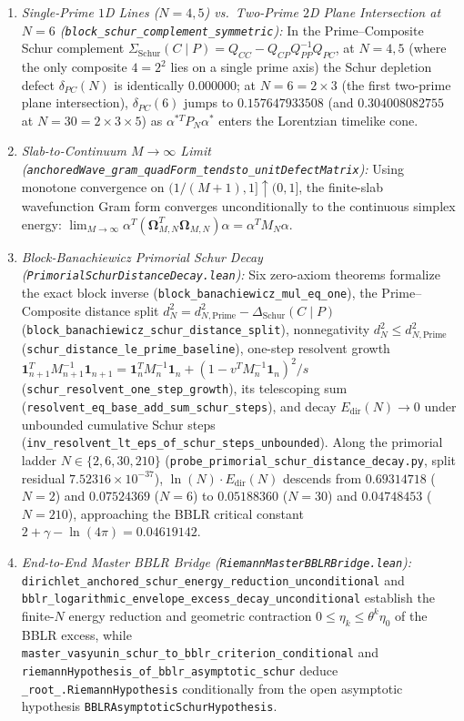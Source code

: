 \documentclass[10pt,a4paper]{article}
\theoremstyle{definition}
\begin{document}
\begin{enumerate}
\item \emph{Single-Prime $1$D Lines ($N=4,5$) vs.\ Two-Prime $2$D Plane Intersection at $N=6$ (\texttt{block\_schur\_complement\_symmetric}):} In the Prime--Composite Schur complement $\Sigma_{\mathrm{Schur}}(C \mid P) = Q_{CC} - Q_{CP} Q_{PP}^{-1} Q_{PC}$, at $N=4,5$ (where the only composite $4 = 2^2$ lies on a single prime axis) the Schur depletion defect $\delta_{PC}(N)$ is identically $0.000000$; at $N = 6 = 2 \times 3$ (the first two-prime plane intersection), $\delta_{PC}(6)$ jumps to $0.157647933508$ (and $0.304008082755$ at $N = 30 = 2 \times 3 \times 5$) as $\alpha^{*T} P_N \alpha^*$ enters the Lorentzian timelike cone.
\item \emph{Slab-to-Continuum $M\to\infty$ Limit (\texttt{anchoredWave\_gram\_quadForm\_tendsto\_unitDefectMatrix}):} Using monotone convergence on $(1/(M+1), 1] \uparrow (0, 1]$, the finite-slab wavefunction Gram form converges unconditionally to the continuous simplex energy: $\lim_{M\to\infty} \alpha^T (\mathbf{\Omega}_{M,N}^T \mathbf{\Omega}_{M,N})\alpha = \alpha^T M_N \alpha$.
\item \emph{Block-Banachiewicz Primorial Schur Decay (\texttt{PrimorialSchurDistanceDecay.lean}):} Six zero-axiom theorems formalize the exact block inverse (\texttt{block\_banachiewicz\_mul\_eq\_one}), the Prime--Composite distance split $d_N^2 = d_{N,\mathrm{Prime}}^2 - \Delta_{\mathrm{Schur}}(C \mid P)$ (\texttt{block\_banachiewicz\_schur\_distance\_split}), nonnegativity $d_N^2 \le d_{N,\mathrm{Prime}}^2$ (\texttt{schur\_distance\_le\_prime\_baseline}), one-step resolvent growth $\mathbf{1}_{n+1}^T M_{n+1}^{-1}\mathbf{1}_{n+1} = \mathbf{1}_n^T M_n^{-1}\mathbf{1}_n + (1 - v^T M_n^{-1}\mathbf{1}_n)^2/s$ (\texttt{schur\_resolvent\_one\_step\_growth}), its telescoping sum (\texttt{resolvent\_eq\_base\_add\_sum\_schur\_steps}), and decay $E_{\mathrm{dir}}(N) \to 0$ under unbounded cumulative Schur steps (\texttt{inv\_resolvent\_lt\_eps\_of\_schur\_steps\_unbounded}). Along the primorial ladder $N \in \{2, 6, 30, 210\}$ (\texttt{probe\_primorial\_schur\_distance\_decay.py}, split residual $7.52316\times 10^{-37}$), $\ln(N)\cdot E_{\mathrm{dir}}(N)$ descends from $0.69314718$ ($N=2$) and $0.07524369$ ($N=6$) to $0.05188360$ ($N=30$) and $0.04748453$ ($N=210$), approaching the BBLR critical constant $2+\gamma-\ln(4\pi) = 0.04619142$.
\item \emph{End-to-End Master BBLR Bridge (\texttt{RiemannMasterBBLRBridge.lean}):} \texttt{dirichlet\_anchored\_schur\_energy\_reduction\_unconditional} and \texttt{bblr\_logarithmic\_envelope\_excess\_decay\_unconditional} establish the finite-$N$ energy reduction and geometric contraction $0 \le \eta_k \le \theta^k \eta_0$ of the BBLR excess, while \texttt{master\_vasyunin\_schur\_to\_bblr\_criterion\_conditional} and \texttt{riemannHypothesis\_of\_bblr\_asymptotic\_schur} deduce \texttt{\_root\_.RiemannHypothesis} conditionally from the open asymptotic hypothesis \texttt{BBLRAsymptoticSchurHypothesis}.
\end{enumerate}



\end{document}

